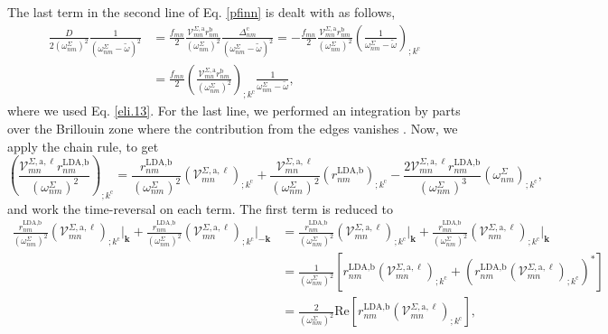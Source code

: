 The last term in the second line of Eq. \eqref{pfinn} is dealt with as follows,
\begin{align}\label{dresn}
\frac{D}{2(\omega^\Sigma_{nm})^2}\frac{1}{(\omega^\Sigma_{nm}-\tilde\omega)^2}
&= \frac{f_{mn}}{2}
   \frac{\mathcal{V}^{\Sigma,\mathrm{a}}_{mn}r^{\mathrm{b}}_{nm}}
        {(\omega^\Sigma_{nm})^2}
   \frac{\Delta^{\mathrm{c}}_{nm}}{(\omega^\Sigma_{nm}-\tilde\omega)^2} 
= -\frac{f_{mn}}{2}
   \frac{\mathcal{V}^{\Sigma,\mathrm{a}}_{mn}r^{\mathrm{b}}_{nm}}
        {(\omega^\Sigma_{nm})^2}
\left(
\frac{1}{\omega^\Sigma_{nm}-\tilde\omega}
\right)_{;k^{\mathrm{c}}}\nonumber\\
&= \frac{f_{mn}}{2}
\left(
\frac{\mathcal{V}^{\Sigma,\mathrm{a}}_{mn}r^{\mathrm{b}}_{nm}}
     {(\omega^\Sigma_{nm})^2}
\right)_{;k^{\mathrm{c}}}
\frac{1}{\omega^\Sigma_{nm}-\tilde\omega},
\end{align} 
where we used Eq. \eqref{eli.13}. For the last line, we performed an integration
by parts over the Brillouin zone where the contribution from the edges vanishes
\cite{ashcroftbook}. Now, we apply the chain rule, to get
\begin{equation}\label{chr}
    \left(\frac{\mathcal{V}^{\Sigma,\text{a},\ell}_{mn}r^{\text{LDA,b}}_{nm}}
    {(\omega^{\Sigma}_{nm})^2}\right)_{;k^{\text{c}}}
=   \frac{r^{\text{LDA,b}}_{nm}}{(\omega^{\Sigma}_{nm})^2}
    \left(\mathcal{V}^{\Sigma,\text{a},\ell}_{mn}\right)_{;k^{\text{c}}}
+   \frac{\mathcal{V}^{\Sigma,\text{a},\ell}_{mn}}{(\omega^{\Sigma}_{nm})^2}
    \left(r^{\text{LDA,b}}_{nm}\right)_{;k^{\text{c}}}
-   \frac{2\mathcal{V}^{\Sigma,\text{a},\ell}_{mn}
    r^{\text{LDA,b}}_{nm}}{(\omega^{\Sigma}_{nm})^3}
    \left(\omega^{\Sigma}_{nm}\right)_{;k^{\text{c}}},
\end{equation}
and work the time-reversal on each term. The first term is reduced to
\begin{align}\label{first_term_gen_deriv}
    \frac{r^{\text{LDA,b}}_{nm}}{(\omega^{\Sigma}_{nm})^{2}}
    \left(\mathcal{V}^{\Sigma,\text{a},\ell}_{mn}\right)
    _{;k^{\text{c}}}\vert_{\mathbf{k}}
+   \frac{r^{\text{LDA,b}}_{nm}}{(\omega^{\Sigma}_{nm})^{2}}
    \left(\mathcal{V}^{\Sigma,\text{a},\ell}_{mn}\right)
    _{;k^{\text{c}}}\vert_{-\mathbf{k}}
&=  \frac{r^{\text{LDA,b}}_{nm}}{(\omega^{\Sigma}_{nm})^{2}}
    \left(\mathcal{V}^{\Sigma,\text{a},\ell}_{mn}\right)
    _{;k^{\text{c}}}\vert_{\mathbf{k}}
+   \frac{r^{\text{LDA,b}}_{mn}}{(\omega^{\Sigma}_{nm})^{2}}
    \left(\mathcal{V}^{\Sigma,\text{a},\ell}_{nm}\right)
    _{;k^{\text{c}}}\vert_{\mathbf{k}}\nonumber\\
&=  \frac{1}{(\omega^{\Sigma}_{nm})^{2}}\left[r^{\text{LDA,b}}_{nm}
    \left(\mathcal{V}^{\Sigma,\text{a},\ell}_{mn}\right)
    _{;k^{\text{c}}}
+   \left(r^{\text{LDA,b}}_{nm}
    \left(\mathcal{V}^{\Sigma,\text{a},\ell}_{mn}\right)
    _{;k^{\text{c}}}\right)^{*}\right]\nonumber\\
&=  \frac{2}{(\omega^{\Sigma}_{nm})^{2}}\mathrm{Re}\left[r^{\text{LDA,b}}_{nm}
    \left(\mathcal{V}^{\Sigma,\text{a},\ell}_{mn}\right)_{;k^{\text{c}}}\right],
\end{align}
